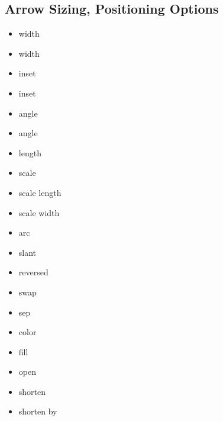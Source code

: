 \subsection*{Arrow Sizing, Positioning Options}
{\scriptsize \begin{multicols}{3}\begin{itemize}[leftmargin=2mm,label={}]
    \item width
    \item width\textquotesingle
    \item inset 
    \item inset\textquotesingle
    \item angle
    \item angle\textquotesingle
    \item length
    \item scale
    \item scale length
    \item scale width
    \item arc
    \item slant 
    \item reversed
    \item swap
    \item sep
    \item color
    \item fill
    \item open
    \item shorten
    \item shorten by
\end{itemize}
\end{multicols}}
\


